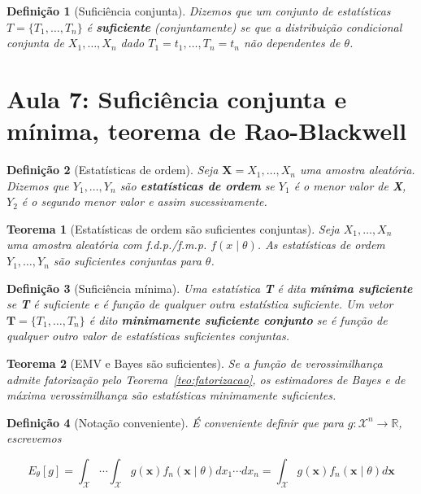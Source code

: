 \documentclass{article}
\newtheorem{theorem}{Teorema}
\newtheorem{definition}{Definição}
\begin{document}
\begin{definition}[Suficiência conjunta]
Dizemos que um conjunto de estatísticas $T = \{T_1, \ldots, T_n\}$ é \textbf{suficiente} (conjuntamente) se que a distribuição condicional conjunta de $X_1, \ldots, X_n$ dado $T_1 = t_1, \ldots, T_n = t_n$ não dependentes de $\theta$.
\end{definition}

\section*{Aula 7: Suficiência conjunta e mínima, teorema de Rao-Blackwell}
\label{s7}
\begin{definition}[Estatísticas de ordem]
Seja $\textbf{X} = X_1, \ldots, X_n$ uma amostra aleatória. Dizemos que $Y_1, \ldots, Y_n$ são \textbf{estatísticas de ordem} se $Y_1$ é o menor valor de \textbf{X}, $Y_2$ é o segundo menor valor e assim sucessivamente.
\end{definition}

\begin{theorem}[Estatísticas de ordem são suficientes conjuntas]
Seja $X_1, \ldots, X_n$ uma amostra aleatória com f.d.p./f.m.p. $f(x \mid \theta)$. As estatísticas de ordem $Y_1, \ldots, Y_n$ são suficientes conjuntas para $\theta$.
\end{theorem}

\begin{definition}[Suficiência mínima]
Uma estatística \textbf{T} é dita \textbf{mínima suficiente} se \textbf{T} é suficiente e é função de qualquer outra estatística suficiente. Um vetor $\textbf{T} = \{ T_1, \ldots, T_n \}$ é dito \textbf{minimamente suficiente conjunto} se é função de qualquer outro valor de estatísticas suficientes conjuntas.
\end{definition}

\begin{theorem}[EMV e Bayes são suficientes]
Se a função de verossimilhança admite fatorização pelo Teorema~\ref{teo:fatorizacao}, os estimadores de Bayes e de máxima verossimilhança são estatísticas minimamente suficientes.
\end{theorem}

\begin{definition}[Notação conveniente]
É conveniente definir que para $g : \mathcal{X}^n \rightarrow \mathbb{R}$, escrevemos

\begin{equation}
    E_\theta [g] = \int_\mathcal{X} \cdots \int_\mathcal{X} g(\textbf{x}) f_n (\textbf{x} \mid \theta) d x_1 \cdots d x_n = \int_\mathcal{X} g(\textbf{x}) f_n (\textbf{x} \mid \theta) d \textbf{x} 
\end{equation}
\end{definition}
\end{document}
